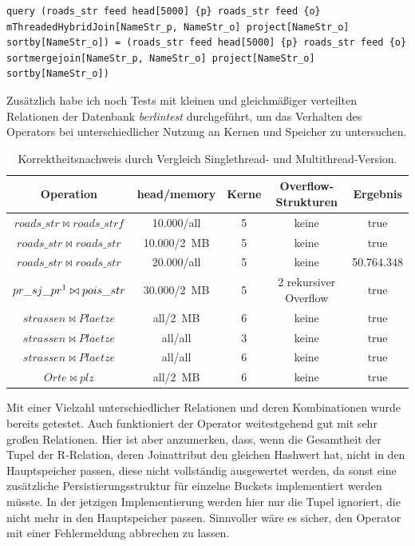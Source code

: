 \documentclass[a4paper,12pt,twoside]{article}
\newcommand{\Fb}[1]{\textit{#1}} %
\begin{document}
\begin{minipage}{0.95\textwidth}
	\begin{lstlisting}[caption={Beispiel Testqueries für den Join-Operator.}, label=list:testjoin]
	query (roads_str feed head[5000] {p} roads_str feed {o} mThreadedHybridJoin[NameStr_p, NameStr_o] project[NameStr_o] sortby[NameStr_o]) = (roads_str feed head[5000] {p} roads_str feed {o} sortmergejoin[NameStr_p, NameStr_o] project[NameStr_o] sortby[NameStr_o])
	\end{lstlisting}
\end{minipage}

Zusätzlich habe ich noch Tests mit kleinen und gleichmäßiger verteilten Relationen der Datenbank \Fb{berlintest} durchgeführt, um das Verhalten des Operators bei unterschiedlicher Nutzung an Kernen und Speicher zu untersuchen. 

\begin{table}
	\centering
	\begin{tabular}{|c|c|c|c|c|}
		\hline
		\rowcolor{gray!30}
		Operation & head/memory & Kerne & Overflow-Strukturen & Ergebnis \\ 
		\hline 
		$roads\_str \bowtie roads\_strf$ & 10.000/all & 5 & keine & true \\ 
		\hline 
		$roads\_str \bowtie roads\_str$ & 10.000/2~MB & 5 & keine & true \\ 
		\hline 
		$roads\_str \bowtie roads\_str$ & 20.000/all & 5 & keine & 50.764.348 \\ 
		\hline 
		$pr\_sj\_pr\footnotemark \bowtie pois\_str$ & 30.000/2~MB & 5 & 2 rekursiver Overflow & true \\ 
		\hline 
		$strassen \bowtie Plaetze$ & all/2~MB & 6 & keine  & true \\ 
		\hline
		$strassen \bowtie Plaetze$ & all/all & 3 & keine & true \\ 
		\hline
		$strassen \bowtie Plaetze$ & all/all & 6 & keine & true \\ 
		\hline
		$Orte \bowtie plz$ & all/2~MB & 6 & keine & true \\ 
		\hline
	\end{tabular}
	\caption{\label{tab:testJoin} Korrektheitsnachweis durch Vergleich Singlethread- und Multithread-Version.}
\end{table}


Mit einer Vielzahl unterschiedlicher Relationen und deren Kombinationen wurde bereits getestet. Auch funktioniert der Operator weitestgehend gut mit sehr großen Relationen. Hier ist aber anzumerken, dass, wenn die Gesamtheit der Tupel der R-Relation, deren Joinattribut den gleichen Hashwert hat, nicht in den Hauptspeicher passen, diese nicht vollständig ausgewertet werden, da sonst eine zusätzliche Persistierungsstruktur für einzelne Buckets implementiert werden müsste. In der jetzigen Implementierung werden hier nur die Tupel ignoriert, die nicht mehr in den Hauptspeicher passen. Sinnvoller wäre es sicher, den Operator mit einer Fehlermeldung abbrechen zu lassen.
\end{document}
